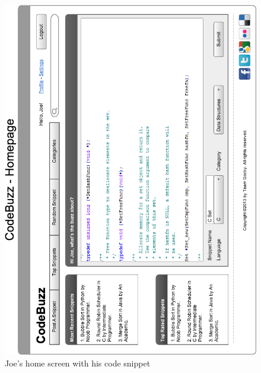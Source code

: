 \documentclass{sig-alt-release2}
\begin{document}
\begin{figure}
\includegraphics[width=\textwidth]{../imgs/CCodeSnippetHorz.png}
\caption{Joe's home screen with his code snippet}
\label{fig:joe}
\end{figure}
\end{document}

